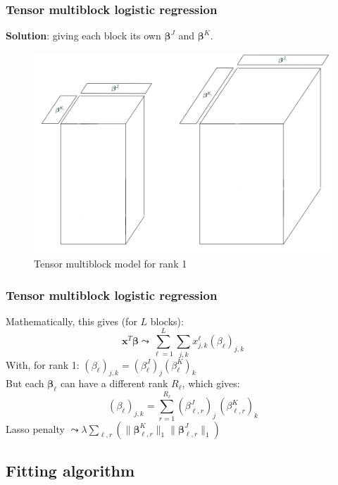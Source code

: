 \documentclass{beamer}
\begin{document}
\begin{frame}
    \frametitle{Tensor multiblock logistic regression}
    \vspace{10 pt}
    \textbf{Solution}: giving each block its own $\bm{\beta}^J$ and $\bm{\beta}^K$.\\[15 pt]
    \begin{figure}
        \centering
        \includegraphics[scale = 0.28]{images/beta_blocks.png}
        \caption{Tensor multiblock model for rank 1}
    \end{figure}
\end{frame}

\begin{frame}
    \frametitle{Tensor multiblock logistic regression}
    Mathematically, this gives (for $L$ blocks):
    $$\mathbf{x}^T\bm{\beta} \leadsto   \sum\limits_{\ell = 1}^L \sum\limits_{j,k} x_{j,k}^\ell(\beta_\ell)_{j,k}$$
    With, for rank 1: $(\beta_\ell)_{j,k} = (\beta_\ell^{J})_j(\beta_\ell^{K})_k$\\[10 pt]
    But each $\bm{\beta}_\ell$ can have a different rank $R_\ell$, which gives:
    $$(\beta_\ell)_{j,k} = \sum\limits_{r = 1}^{R_\ell} (\beta_{\ell,r}^J)_j \, (\beta_{\ell,r}^K)_k $$
    Lasso penalty $\leadsto \lambda \sum\limits_{\ell,r} \left( \lVert \bm{\beta}_{\ell,r}^K \rVert_1 \lVert \bm{\beta}_{\ell,r}^J \rVert_1 \right)$
\end{frame}

\begin{frame}
    \section{Fitting algorithm}
\end{frame}
\end{document}
